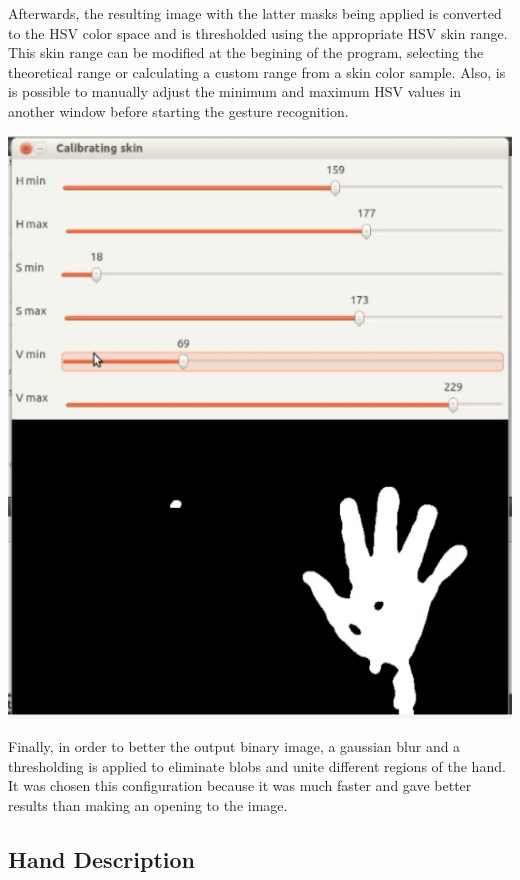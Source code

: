 Afterwards, the resulting image with the latter masks being applied is converted to the HSV color space and is thresholded using the appropriate HSV skin range.
This skin range can be modified at the begining of the program, selecting the theoretical range or calculating a custom range from a skin color sample. Also, is is possible to manually adjust the minimum and maximum HSV values in another window before starting the gesture recognition. 

\begin{center}
\includegraphics[scale=0.5]{images/threshold.png} 
\end{center}

Finally, in order to better the output binary image, a gaussian blur and a thresholding is applied to eliminate blobs and unite different regions of the hand. It was chosen this configuration because it was much faster and gave better results than making an opening to the image. 

 
\subsection{Hand Description}

